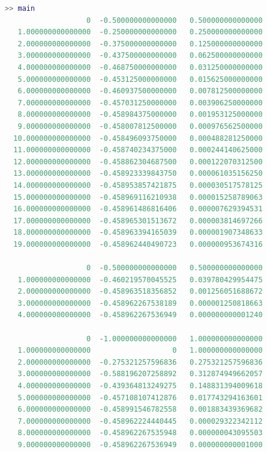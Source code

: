 



\begin{lstlisting}[language = MATLAB]
>> main
                   0  -0.500000000000000   0.500000000000000
   1.000000000000000  -0.250000000000000   0.250000000000000
   2.000000000000000  -0.375000000000000   0.125000000000000
   3.000000000000000  -0.437500000000000   0.062500000000000
   4.000000000000000  -0.468750000000000   0.031250000000000
   5.000000000000000  -0.453125000000000   0.015625000000000
   6.000000000000000  -0.460937500000000   0.007812500000000
   7.000000000000000  -0.457031250000000   0.003906250000000
   8.000000000000000  -0.458984375000000   0.001953125000000
   9.000000000000000  -0.458007812500000   0.000976562500000
  10.000000000000000  -0.458496093750000   0.000488281250000
  11.000000000000000  -0.458740234375000   0.000244140625000
  12.000000000000000  -0.458862304687500   0.000122070312500
  13.000000000000000  -0.458923339843750   0.000061035156250
  14.000000000000000  -0.458953857421875   0.000030517578125
  15.000000000000000  -0.458969116210938   0.000015258789063
  16.000000000000000  -0.458961486816406   0.000007629394531
  17.000000000000000  -0.458965301513672   0.000003814697266
  18.000000000000000  -0.458963394165039   0.000001907348633
  19.000000000000000  -0.458962440490723   0.000000953674316

                   0  -0.500000000000000   0.500000000000000
   1.000000000000000  -0.460219570045525   0.039780429954475
   2.000000000000000  -0.458963518356852   0.001256051688672
   3.000000000000000  -0.458962267538189   0.000001250818663
   4.000000000000000  -0.458962267536949   0.000000000001240

                   0  -1.000000000000000   1.000000000000000
   1.000000000000000                   0   1.000000000000000
   2.000000000000000  -0.275321257596836   0.275321257596836
   3.000000000000000  -0.588196207258892   0.312874949662057
   4.000000000000000  -0.439364813249275   0.148831394009618
   5.000000000000000  -0.457108107412876   0.017743294163601
   6.000000000000000  -0.458991546782558   0.001883439369682
   7.000000000000000  -0.458962224440445   0.000029322342112
   8.000000000000000  -0.458962267535948   0.000000043095503
   9.000000000000000  -0.458962267536949   0.000000000001000


\end{lstlisting}
